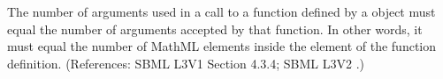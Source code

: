 The number of arguments used in a call to a function defined by a
\FunctionDefinition object must equal the number of arguments accepted by
that function.  In other words, it must equal the number of MathML
 elements inside the  element of the function
definition.  (References: SBML L3V1 Section 4.3.4; SBML L3V2
.)
